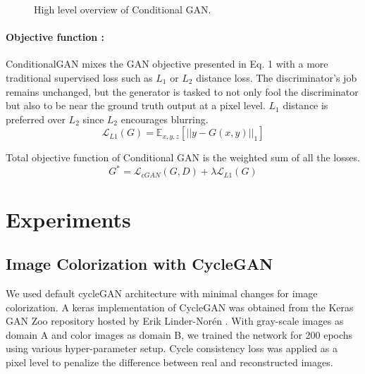\documentclass{article} %
\begin{document}
\begin{figure}[!htb]
	\begin{center}
	\end{center}
	\caption{High level overview of Conditional GAN.}
	\label{fig:pix2pix}
\end{figure}

\paragraph{Objective function  :}
ConditionalGAN mixes the GAN objective presented in Eq. 1 with a more traditional supervised loss such as $L_1$ or $L_2$ distance loss. The discriminator’s job remains unchanged, but the generator is tasked to not only fool the discriminator but also to be near the ground truth output at a pixel level. $L_1$ distance is preferred over $L_2$ since $L_2$ encourages blurring.
\begin{equation}
    \mathcal{L}_{L1}(G) = \mathbb{E}_{ x,y,z}\left[||y - G(x,y)||_{1}\right]
\end{equation}

Total objective function of Conditional GAN is the weighted sum of all the losses.
\begin{equation}
    G^* = \mathcal{L}_{cGAN}(G,D) + \lambda\mathcal{L}_{L1}(G)
\end{equation}

\section{Experiments}
\subsection{Image Colorization with CycleGAN}
We used default cycleGAN architecture with minimal changes for image colorization. A keras implementation of CycleGAN was obtained from the Keras GAN Zoo repository hosted by Erik Linder-Norén \cite{cycleGanImpl}. With gray-scale images as domain A and color images as domain B, we trained the network for 200 epochs using various hyper-parameter setup. Cycle consistency loss was applied as a pixel level to penalize the difference between real and reconstructed images.
\end{document}
